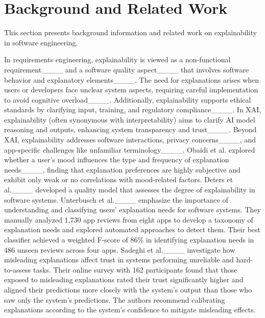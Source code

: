 \section{Background and Related Work}
\label{sec:background}

This section presents background information and related work on explainability in software engineering.

In requirements engineering, explainability is viewed as a non-functional requirement____ and a software quality aspect____ that involves software behavior and explanatory elements____. The need for explanations arises when users or developers face unclear system aspects, requiring careful implementation to avoid cognitive overload____. Additionally, explainability supports ethical standards by clarifying input, training, and regulatory compliance____.
In XAI, explainability (often synonymous with interpretability) aims to clarify AI model reasoning and outputs, enhancing system transparency and trust____. Beyond XAI, explainability addresses software interactions, privacy concerns____, and app-specific challenges like unfamiliar terminology____.
Obaidi et al. explored whether a user's mood influences the type and frequency of explanation needs____, finding that explanation preferences are highly subjective and exhibit only weak or no correlations with mood-related factors. 
Deters et al.____ developed a quality model that assesses the degree of explainability in software systems.
Unterbusch et al.____ emphasize the importance of understanding and classifying users' explanation needs for software systems. They manually analyzed 1,730 app reviews from eight apps to develop a taxonomy of explanation needs and explored automated approaches to detect them. Their best classifier achieved a weighted F-score of 86\% in identifying explanation needs in 486 unseen reviews across four apps.  
Sadeghi et al.____ investigate how misleading explanations affect trust in systems performing unreliable and hard-to-assess tasks. Their online survey with 162 participants found that those exposed to misleading explanations rated their trust significantly higher and aligned their predictions more closely with the system's output than those who saw only the system’s predictions. The authors recommend calibrating explanations according to the system’s confidence to mitigate misleading effects.
